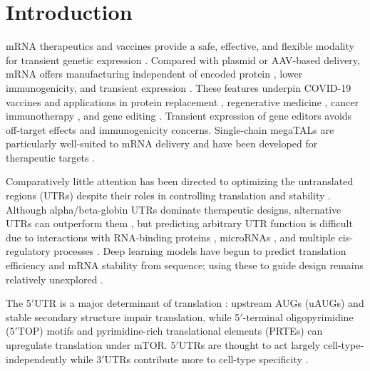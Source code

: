\documentclass[11pt]{article}
\begin{document}
\section{Introduction}
mRNA therapeutics and vaccines provide a safe, effective, and flexible modality for transient genetic expression \cite{pardi2018mrna}. Compared with plasmid or AAV-based delivery, mRNA offers manufacturing independent of encoded protein \cite{sahin2014mrna}, lower immunogenicity, and transient expression \cite{kowalski2019delivering,zhang2019advances}. These features underpin COVID-19 vaccines \cite{polack2020safety,baden2021efficacy} and applications in protein replacement \cite{trepotec2019delivery,roth2020optimizing}, regenerative medicine \cite{chien2019regeneration,zangi2013modified}, cancer immunotherapy \cite{sahin2017personalized,vormehr2018harnessing}, and gene editing \cite{kowalski2019delivering,rohner2022unlocking}. Transient expression of gene editors avoids off-target effects \cite{zhang2019advances} and immunogenicity concerns. Single-chain megaTALs \cite{boissel2014megatals} are particularly well-suited to mRNA delivery and have been developed for therapeutic targets \cite{sather2015efficient,osborn2016crispr,johnson2022engineered}.

Comparatively little attention has been directed to optimizing the untranslated regions (UTRs) despite their roles in controlling translation and stability \cite{pardi2018mrna,rohner2022unlocking}. Although alpha/beta-globin UTRs dominate therapeutic designs, alternative UTRs can outperform them \cite{orlandini2019mcherry,cao2021highthroughput,orlandini2020cis,yamagami2021uorfs}, but predicting arbitrary UTR function is difficult due to interactions with RNA-binding proteins \cite{gerstberger2014mammalian}, microRNAs \cite{friedman2009most,bartel2009micrornas}, and multiple cis-regulatory processes \cite{mayr2017regulation}. Deep learning models have begun to predict translation efficiency \cite{sample2019human,cuperus2017deep} and mRNA stability \cite{agarwal2022genetic} from sequence; using these to guide design remains relatively unexplored \cite{castillo2021machine}.

The 5$'$UTR is a major determinant of translation \cite{kozak1987analysis,hinnebusch2016translational,jackson2010mechanism}: upstream AUGs (uAUGs) \cite{calvo2009upstream,hinnebusch2016translational} and stable secondary structure \cite{jackson2010mechanism} impair translation, while 5$'$-terminal oligopyrimidine (5$'$TOP) motifs \cite{meyuhas2015substrates,philippe2020translation} and pyrimidine-rich translational elements (PRTEs) \cite{hsieh2012translational,gandin2016nanocage} can upregulate translation under mTOR. 5$'$UTRs are thought to act largely cell-type-independently while 3$'$UTRs contribute more to cell-type specificity \cite{cenik2015integrative,blair2017dissection}.
\end{document}
